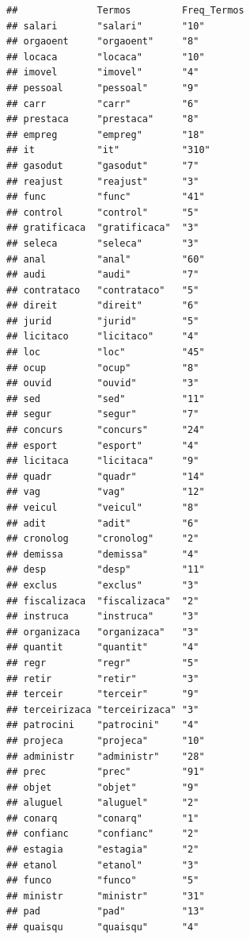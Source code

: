 \documentclass[]{article}
\begin{document}
\begin{verbatim}
##              Termos         Freq_Termos
## salari       "salari"       "10"       
## orgaoent     "orgaoent"     "8"        
## locaca       "locaca"       "10"       
## imovel       "imovel"       "4"        
## pessoal      "pessoal"      "9"        
## carr         "carr"         "6"        
## prestaca     "prestaca"     "8"        
## empreg       "empreg"       "18"       
## it           "it"           "310"      
## gasodut      "gasodut"      "7"        
## reajust      "reajust"      "3"        
## func         "func"         "41"       
## control      "control"      "5"        
## gratificaca  "gratificaca"  "3"        
## seleca       "seleca"       "3"        
## anal         "anal"         "60"       
## audi         "audi"         "7"        
## contrataco   "contrataco"   "5"        
## direit       "direit"       "6"        
## jurid        "jurid"        "5"        
## licitaco     "licitaco"     "4"        
## loc          "loc"          "45"       
## ocup         "ocup"         "8"        
## ouvid        "ouvid"        "3"        
## sed          "sed"          "11"       
## segur        "segur"        "7"        
## concurs      "concurs"      "24"       
## esport       "esport"       "4"        
## licitaca     "licitaca"     "9"        
## quadr        "quadr"        "14"       
## vag          "vag"          "12"       
## veicul       "veicul"       "8"        
## adit         "adit"         "6"        
## cronolog     "cronolog"     "2"        
## demissa      "demissa"      "4"        
## desp         "desp"         "11"       
## exclus       "exclus"       "3"        
## fiscalizaca  "fiscalizaca"  "2"        
## instruca     "instruca"     "3"        
## organizaca   "organizaca"   "3"        
## quantit      "quantit"      "4"        
## regr         "regr"         "5"        
## retir        "retir"        "3"        
## terceir      "terceir"      "9"        
## terceirizaca "terceirizaca" "3"        
## patrocini    "patrocini"    "4"        
## projeca      "projeca"      "10"       
## administr    "administr"    "28"       
## prec         "prec"         "91"       
## objet        "objet"        "9"        
## aluguel      "aluguel"      "2"        
## conarq       "conarq"       "1"        
## confianc     "confianc"     "2"        
## estagia      "estagia"      "2"        
## etanol       "etanol"       "3"        
## funco        "funco"        "5"        
## ministr      "ministr"      "31"       
## pad          "pad"          "13"       
## quaisqu      "quaisqu"      "4"        

\end{verbatim}
\end{document}
